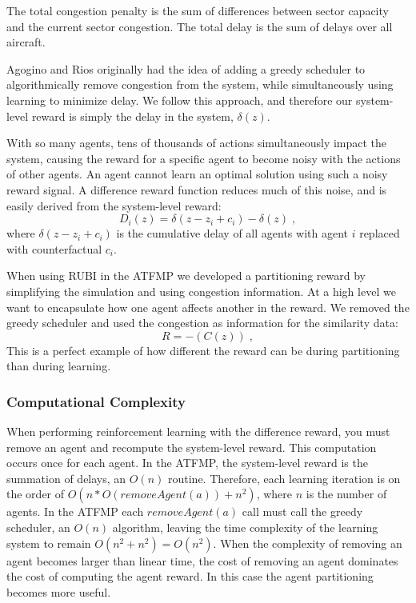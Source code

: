 \documentclass[letterpaper]{article}
\begin{document}
The total congestion penalty is the sum of differences between sector capacity and the current sector congestion. The total delay is the sum of delays over all aircraft.

Agogino and Rios originally had the idea of adding a greedy scheduler to algorithmically remove congestion from the system, while simultaneously using learning to minimize delay. We follow this approach, and therefore our system-level reward is simply the delay in the system, $\delta(z)$.

With so many agents, tens of thousands of actions simultaneously impact the system, causing the reward for a specific agent to become noisy with the actions of other agents. An agent cannot learn an optimal solution using such a noisy reward signal. A difference reward function reduces much of this noise, and is easily derived from the system-level reward:
%
\begin{equation}
D_i(z) = \delta(z-z_i + c_i) - \delta(z)\;,
\end{equation}
%
where \textit{$\delta(z-z_i + c_i)$} is the cumulative delay of all agents with agent $i$ replaced with counterfactual \textit{$c_i$}.

When using RUBI in the ATFMP we developed a partitioning reward by simplifying the simulation and using congestion information. At a high level we want to encapsulate how one agent affects another in the reward. We removed the greedy scheduler and used the congestion as information for the similarity data:
%
\begin{equation} \label{eq:RUBI ATFMP-L}
R = -(C(z))\;,
\end{equation}
%
This is a perfect example of how different the reward can be during partitioning than during learning.

\subsubsection{Computational Complexity}

When performing reinforcement learning with the difference reward, you must remove an agent and recompute the system-level reward. This computation occurs once for each agent. In the ATFMP, the system-level reward is the summation of delays, an $O(n)$ routine. Therefore, each learning iteration is on the order of $O(n * O(removeAgent(a)) + n^2)$, where $n$ is the number of agents. In the ATFMP each $removeAgent(a)$ call must call the greedy scheduler, an $O(n)$ algorithm, leaving the time complexity of the learning system to remain $O(n^2 + n^2) = O(n^2)$. When the complexity of removing an agent becomes larger than linear time, the cost of removing an agent dominates the cost of computing the agent reward. In this case the agent partitioning becomes more useful.
\end{document}
